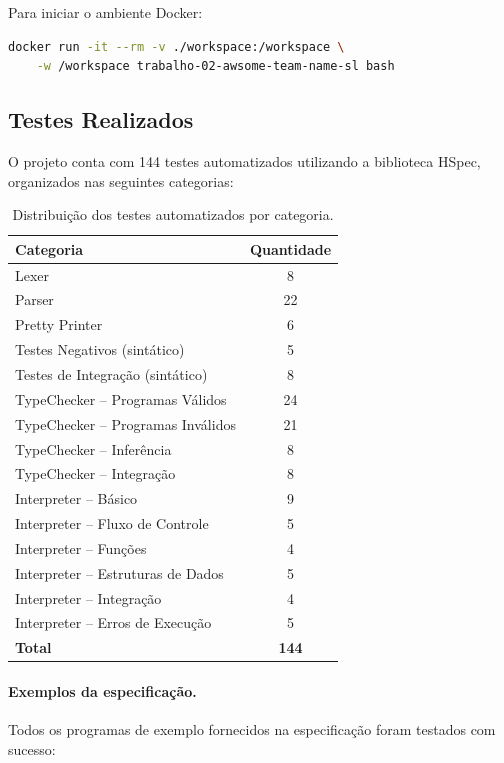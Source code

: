 \documentclass[12pt,a4paper]{article}
\begin{document}
Para iniciar o ambiente Docker:

\begin{lstlisting}[language=bash,style=mystyle]
docker run -it --rm -v ./workspace:/workspace \
    -w /workspace trabalho-02-awsome-team-name-sl bash
\end{lstlisting}

\subsection{Testes Realizados}

O projeto conta com 144 testes automatizados utilizando a biblioteca HSpec, organizados nas seguintes categorias:

\begin{table}[h!]
\centering
\begin{tabular}{|l|c|}
\hline
\textbf{Categoria} & \textbf{Quantidade} \\
\hline
Lexer & 8 \\
Parser & 22 \\
Pretty Printer & 6 \\
Testes Negativos (sintático) & 5 \\
Testes de Integração (sintático) & 8 \\
TypeChecker -- Programas Válidos & 24 \\
TypeChecker -- Programas Inválidos & 21 \\
TypeChecker -- Inferência & 8 \\
TypeChecker -- Integração & 8 \\
Interpreter -- Básico & 9 \\
Interpreter -- Fluxo de Controle & 5 \\
Interpreter -- Funções & 4 \\
Interpreter -- Estruturas de Dados & 5 \\
Interpreter -- Integração & 4 \\
Interpreter -- Erros de Execução & 5 \\
\hline
\textbf{Total} & \textbf{144} \\
\hline
\end{tabular}
\caption{Distribuição dos testes automatizados por categoria.}
\end{table}

\paragraph{Exemplos da especificação.} Todos os programas de exemplo fornecidos na especificação foram testados com sucesso:
\end{document}
